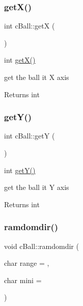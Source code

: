 \subsubsection{\texorpdfstring{get\+X()}{getX()}}
{\footnotesize\ttfamily int c\+Ball\+::getX (\begin{DoxyParamCaption}{ }\end{DoxyParamCaption})}



int \mbox{\hyperlink{classc_ball_a6216240ba8780e2510c2d2eb5c792be0}{get\+X()}} 

get the ball it X axis

\begin{DoxyReturn}{Returns}
int 
\end{DoxyReturn}
\mbox{\label{classc_ball_a4439db1ba25e8f69fde4fdf0fa1b4f24}} 
\subsubsection{\texorpdfstring{get\+Y()}{getY()}}
{\footnotesize\ttfamily int c\+Ball\+::getY (\begin{DoxyParamCaption}{ }\end{DoxyParamCaption})}



int \mbox{\hyperlink{classc_ball_a4439db1ba25e8f69fde4fdf0fa1b4f24}{get\+Y()}} 

get the ball it Y axis

\begin{DoxyReturn}{Returns}
int 
\end{DoxyReturn}
\mbox{\label{classc_ball_a026eb3b20f5ad8461d3f403a7343de33}} 
\subsubsection{\texorpdfstring{ramdomdir()}{ramdomdir()}}
{\footnotesize\ttfamily void c\+Ball\+::ramdomdir (\begin{DoxyParamCaption}\item[{char}]{range = {},  }\item[{char}]{mini = {} }\end{DoxyParamCaption})}



